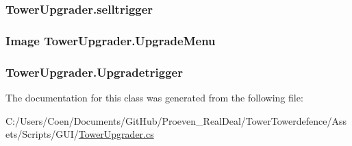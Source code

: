 \subsubsection[{\texorpdfstring{selltrigger}{selltrigger}}]{ Tower\+Upgrader.\+selltrigger}\hypertarget{class_tower_upgrader_adb4b4a44efdd343c03735badc9aa8917}{}\label{class_tower_upgrader_adb4b4a44efdd343c03735badc9aa8917}
\subsubsection[{\texorpdfstring{Upgrade\+Menu}{UpgradeMenu}}]{\setlength{\rightskip}{0pt plus 5cm}Image Tower\+Upgrader.\+Upgrade\+Menu}\hypertarget{class_tower_upgrader_ad79ad8068850b5c494dd6e4a76a53932}{}\label{class_tower_upgrader_ad79ad8068850b5c494dd6e4a76a53932}
\subsubsection[{\texorpdfstring{Upgradetrigger}{Upgradetrigger}}]{ Tower\+Upgrader.\+Upgradetrigger}\hypertarget{class_tower_upgrader_aa743a1544eb92eeea8e25fd7a609e0f9}{}\label{class_tower_upgrader_aa743a1544eb92eeea8e25fd7a609e0f9}


The documentation for this class was generated from the following file\+:\begin{DoxyCompactItemize}
\item 
C\+:/\+Users/\+Coen/\+Documents/\+Git\+Hub/\+Proeven\+\_\+\+Real\+Deal/\+Tower\+Towerdefence/\+Assets/\+Scripts/\+G\+U\+I/\hyperlink{_tower_upgrader_8cs}{Tower\+Upgrader.\+cs}\end{DoxyCompactItemize}
